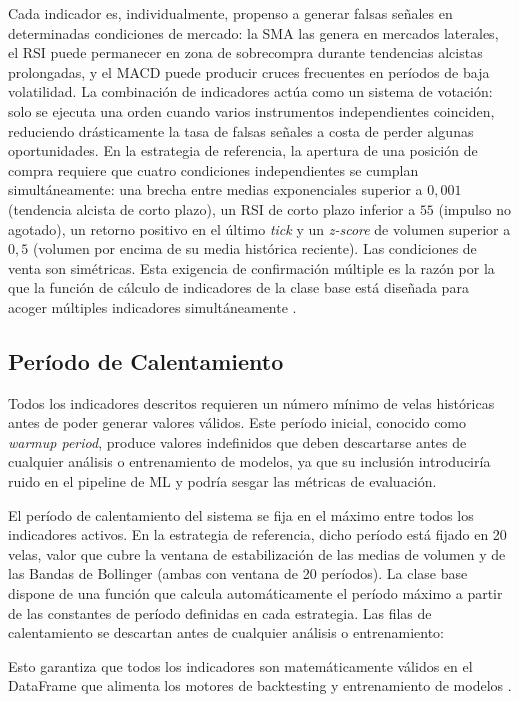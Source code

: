 Cada indicador es, individualmente, propenso a generar falsas señales en determinadas condiciones de mercado: la SMA las genera en mercados laterales, el RSI puede permanecer en zona de sobrecompra durante tendencias alcistas prolongadas, y el MACD puede producir cruces frecuentes en períodos de baja volatilidad. La combinación de indicadores actúa como un sistema de votación: solo se ejecuta una orden cuando varios instrumentos independientes coinciden, reduciendo drásticamente la tasa de falsas señales a costa de perder algunas oportunidades. En la estrategia de referencia, la apertura de una posición de compra requiere que cuatro condiciones independientes se cumplan simultáneamente: una brecha entre medias exponenciales superior a $0{,}001$ (tendencia alcista de corto plazo), un RSI de corto plazo inferior a $55$ (impulso no agotado), un retorno positivo en el último \textit{tick} y un \textit{z-score} de volumen superior a $0{,}5$ (volumen por encima de su media histórica reciente). Las condiciones de venta son simétricas. Esta exigencia de confirmación múltiple es la razón por la que la función de cálculo de indicadores de la clase base está diseñada para acoger múltiples indicadores simultáneamente \parencite{murphy_technical_1999}.

\subsection{Período de Calentamiento}

Todos los indicadores descritos requieren un número mínimo de velas históricas antes de poder generar valores válidos. Este período inicial, conocido como \textit{warmup period}, produce valores indefinidos que deben descartarse antes de cualquier análisis o entrenamiento de modelos, ya que su inclusión introduciría ruido en el pipeline de ML y podría sesgar las métricas de evaluación.

El período de calentamiento del sistema se fija en el máximo entre todos los indicadores activos. En la estrategia de referencia, dicho período está fijado en 20 velas, valor que cubre la ventana de estabilización de las medias de volumen y de las Bandas de Bollinger (ambas con ventana de 20 períodos). La clase base dispone de una función que calcula automáticamente el período máximo a partir de las constantes de período definidas en cada estrategia. Las filas de calentamiento se descartan antes de cualquier análisis o entrenamiento:

Esto garantiza que todos los indicadores son matemáticamente válidos en el DataFrame que alimenta los motores de backtesting y entrenamiento de modelos \parencite{mckinney_python_2022}.